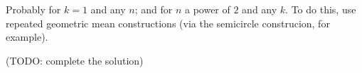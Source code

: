 Probably
  for $k=1$ and any $n$; and
  for $n$ a power of $2$ and any $k$.
To do this, use repeated geometric mean constructions
(via the semicircle construcion, for example).

(TODO: complete the solution)
